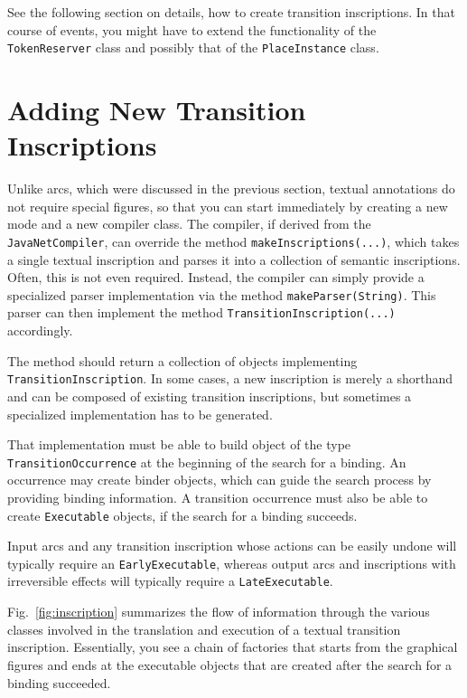 See the following section on details, how to create
transition inscriptions. In that course of events, you might have
to extend the functionality of the \texttt{TokenReserver} class
and possibly that of the \texttt{PlaceInstance} class.


\section{Adding New Transition Inscriptions}

Unlike arcs, which were discussed in the previous section, 
textual annotations do not require special
figures, so that you can start immediately by creating
a new mode and a new compiler class.
The compiler, if derived from the \texttt{JavaNetCompiler},
can override the method \texttt{makeInscriptions(...)},
which takes a single textual inscription and parses
it into a collection of semantic inscriptions.
Often, this is not even required. Instead, the compiler can simply
provide a specialized parser implementation via the method
\texttt{makeParser(String)}. This parser can then implement
the method \texttt{TransitionInscription(...)} accordingly.

The method should return a collection of objects
implementing \texttt{TransitionInscription}.
In some cases, a new inscription is merely a shorthand
and can be composed of existing transition inscriptions,
but sometimes a specialized implementation has to be generated.

That implementation must be able to build object of the type
\texttt{TransitionOccurrence} at the beginning of the search for a 
binding. An occurrence may create binder objects, which can guide the
search process by providing binding information.
A transition occurrence must also be able to create
\texttt{Executable} objects, if the search for a binding succeeds.

Input arcs and any transition inscription whose actions can be easily undone
will typically require an \texttt{EarlyExecutable},
whereas output arcs and inscriptions with irreversible
effects will typically require a \texttt{LateExecutable}.


Fig.~\ref{fig:inscription} summarizes the flow of information
through the various classes involved in the translation and execution of
a textual transition inscription. Essentially, you see a chain of 
factories that starts from the graphical figures and
ends at the executable objects that are created after
the search for a binding succeeded.


